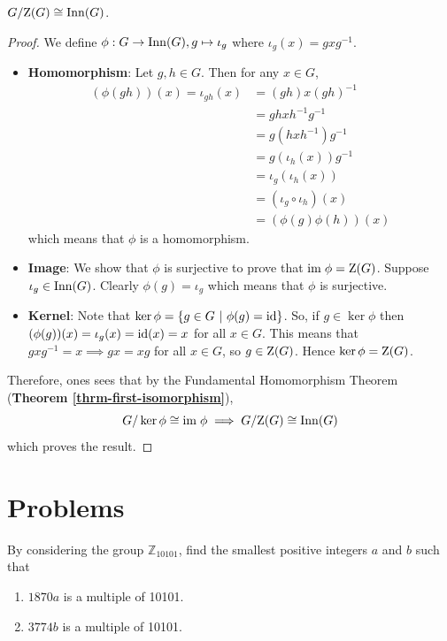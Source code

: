 \begin{proposition}
    $G/\mathrm{Z}(G) \cong \mathrm{Inn}(G)$.
\end{proposition}
\begin{proof}
    We define $\phi: G \to \mathrm{Inn}(G), g \mapsto \iota_g$ where $\iota_g(x) = gxg^{-1}$.
    \begin{itemize}
        \item \textbf{Homomorphism}: Let $g, h \in G$. Then for any $x \in G$,
        \begin{align*}
            (\phi(gh))(x) = \iota_{gh}(x) &= (gh)x(gh)^{-1}\\
            &= ghxh^{-1}g^{-1}\\
            &= g(hxh^{-1})g^{-1}\\
            &= g(\iota_h(x))g^{-1}\\
            &=\iota_g(\iota_h(x))\\
            &=(\iota_g\circ\iota_h)(x)\\
            &=(\phi(g)\phi(h))(x)
        \end{align*}
        which means that $\phi$ is a homomorphism.

        \item \textbf{Image}: We show that $\phi$ is surjective to prove that $\mathrm{im}\; \phi = \mathrm{Z}(G)$. Suppose $\iota_g \in \mathrm{Inn}(G)$. Clearly $\phi(g) = \iota_g$  which means that $\phi$ is surjective.

        \item \textbf{Kernel}: Note that $\ker\phi = \{g \in G \ | \ \phi(g) = \mathrm{id}\}$. So, if $g \in \ker\phi$ then $(\phi(g))(x) = \iota_g(x) = \mathrm{id}(x) = x$ for all $x \in G$. This means that $gxg^{-1} = x \implies gx = xg$ for all $x \in G$, so $g \in \mathrm{Z}(G)$. Hence $\ker\phi = \mathrm{Z}(G)$.
    \end{itemize}
    Therefore, ones sees that by the Fundamental Homomorphism Theorem (\textbf{Theorem \ref{thrm-first-isomorphism}}),
    \[
        G/\ker\phi \cong \mathrm{im}\;\phi \implies G/\mathrm{Z}(G) \cong \mathrm{Inn}(G)
    \]
    which proves the result.
\end{proof}

\newpage

\section{Problems}
\begin{problem}
    By considering the group $\mathbb{Z}_{10101}$, find the smallest positive integers $a$ and $b$ such that
    \begin{enumerate}[label=(\alph*)]
        \item $1870a$ is a multiple of 10101.
        \item $3774b$ is a multiple of 10101.
    \end{enumerate}
\end{problem}

